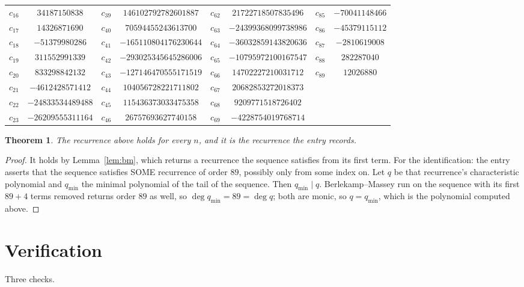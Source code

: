 \documentclass[11pt,a4paper]{article}
\theoremstyle{plain}
\newtheorem{theorem}{Theorem}
\theoremstyle{definition}
\begin{document}
\begin{center}
\begin{tabular}{cccccccc}
$c_{16}$ & $34187150838$ & $c_{39}$ & $146102792782601887$ & $c_{62}$ & $21722718507835496$ & $c_{85}$ & $-70041148466$ \\
$c_{17}$ & $14326871690$ & $c_{40}$ & $70594455243613700$ & $c_{63}$ & $-24399368099738986$ & $c_{86}$ & $-45379115112$ \\
$c_{18}$ & $-51379980286$ & $c_{41}$ & $-165110804176230644$ & $c_{64}$ & $-36032859143820636$ & $c_{87}$ & $-2810619008$ \\
$c_{19}$ & $311552991339$ & $c_{42}$ & $-293025345645286006$ & $c_{65}$ & $-10795972100167547$ & $c_{88}$ & $282287040$ \\
$c_{20}$ & $833298842132$ & $c_{43}$ & $-127146470555171519$ & $c_{66}$ & $14702227210031712$ & $c_{89}$ & $12026880$ \\
$c_{21}$ & $-4612428571412$ & $c_{44}$ & $104056728221711802$ & $c_{67}$ & $20682853272018373$ &  &  \\
$c_{22}$ & $-24833534489488$ & $c_{45}$ & $115436373033475358$ & $c_{68}$ & $9209771518726402$ &  &  \\
$c_{23}$ & $-26209555311164$ & $c_{46}$ & $26757693627740158$ & $c_{69}$ & $-4228754019768714$ &  &  \\
\end{tabular}
\end{center}

\begin{theorem}
The recurrence above holds for every $n$, and it is the recurrence the entry records.
\end{theorem}

\begin{proof}
It holds by Lemma~\ref{lem:bm}, which returns a recurrence the sequence satisfies from its
first term. For the identification: the entry asserts that the sequence satisfies SOME
recurrence of order $89$, possibly only from some index on. Let $q$ be that recurrence's
characteristic polynomial and $q_{\min}$ the minimal polynomial of the tail of the sequence.
Then $q_{\min}\mid q$. Berlekamp--Massey run on the sequence with its first $89+4$ terms
removed returns order $89$ as well, so $\deg q_{\min}=89=\deg q$; both are monic, so
$q=q_{\min}$, which is the polynomial computed above.
\end{proof}

\section{Verification}

Three checks.
\end{document}
